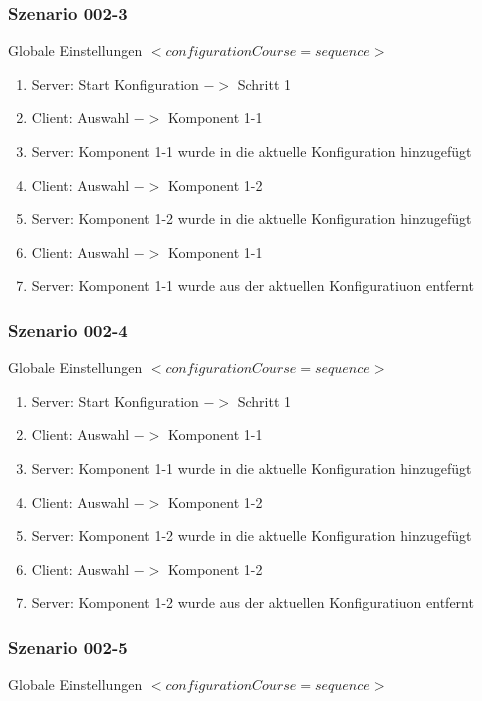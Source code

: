 \documentclass{article}
\begin{document}
\subsubsection{Szenario 002-3}

Globale Einstellungen $<configurationCourse=sequence>$

\begin{enumerate}
  \item Server: Start Konfiguration $->$ Schritt 1
  \item Client: Auswahl $->$ Komponent 1-1
  \item Server: Komponent 1-1 wurde in die aktuelle Konfiguration hinzugef\"ugt
  \item Client: Auswahl $->$ Komponent 1-2
  \item Server: Komponent 1-2 wurde in die aktuelle Konfiguration hinzugef\"ugt
  \item Client: Auswahl $->$ Komponent 1-1
  \item Server: Komponent 1-1 wurde aus der aktuellen Konfiguratiuon entfernt
\end{enumerate}

\subsubsection{Szenario 002-4}

Globale Einstellungen $<configurationCourse=sequence>$

\begin{enumerate}
  \item Server: Start Konfiguration $->$ Schritt 1
  \item Client: Auswahl $->$ Komponent 1-1
  \item Server: Komponent 1-1 wurde in die aktuelle Konfiguration hinzugef\"ugt
  \item Client: Auswahl $->$ Komponent 1-2
  \item Server: Komponent 1-2 wurde in die aktuelle Konfiguration hinzugef\"ugt
  \item Client: Auswahl $->$ Komponent 1-2
  \item Server: Komponent 1-2 wurde aus der aktuellen Konfiguratiuon entfernt
\end{enumerate}

\subsubsection{Szenario 002-5}

Globale Einstellungen $<configurationCourse=sequence>$
\end{document}
